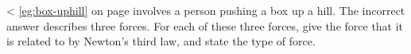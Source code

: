 <%
\ref{eg:box-uphill} on page \pageref{eg:box-uphill} involves a person
pushing a box up a hill. The incorrect answer describes
three forces. For each of these three forces, give the force
that it is related to by Newton's third law, and state the type of force.
